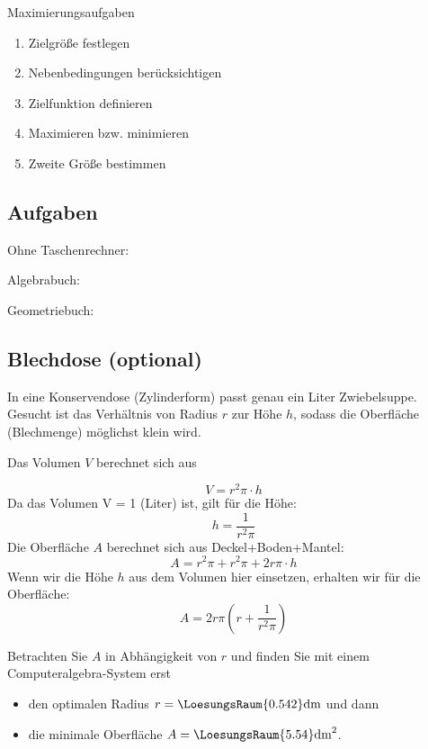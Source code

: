   
  \begin{rezept}{Maximierungsaufgaben}{}
    \begin{enumerate}
    \item Zielgröße festlegen
    \item Nebenbedingungen berücksichtigen
    \item Zielfunktion definieren
    \item Maximieren bzw. minimieren
    \item Zweite Größe bestimmen
      \end{enumerate}
\end{rezept}
  

\subsection*{Aufgaben}
Ohne Taschenrechner:

Algebrabuch:


Geometriebuch:

\newpage


\subsection{Blechdose (optional)}
In eine Konservendose (Zylinderform) passt genau ein Liter Zwiebelsuppe. Gesucht ist das Verhältnis von Radius $r$ zur Höhe $h$, sodass die Oberfläche (Blechmenge) möglichst klein wird.

Das Volumen $V$ berechnet sich aus

$$V = r^2\pi\cdot{}h$$
Da das Volumen V = 1 (Liter) ist, gilt für die Höhe:
$$h = \frac{1}{r^2\pi}$$
Die Oberfläche $A$ berechnet sich aus Deckel+Boden+Mantel:  
$$A=r^2\pi + r^2\pi + 2r\pi\cdot{}h$$
Wenn wir die Höhe $h$ aus dem Volumen hier einsetzen, erhalten wir für die Oberfläche:
$$A=2r\pi\left(r+\frac{1}{r^2\pi}\right)$$

Betrachten Sie $A$ in Abhängigkeit von $r$ und finden Sie mit einem
Computeralgebra-System erst
\begin{itemize}
\item
  den optimalen Radius $r=\LoesungsRaum{0.542}\textrm{dm}$ und dann
\item
  die minimale Oberfläche $A= \LoesungsRaum{5.54}\textrm{dm}^2$.
\end{itemize}
\newpage


